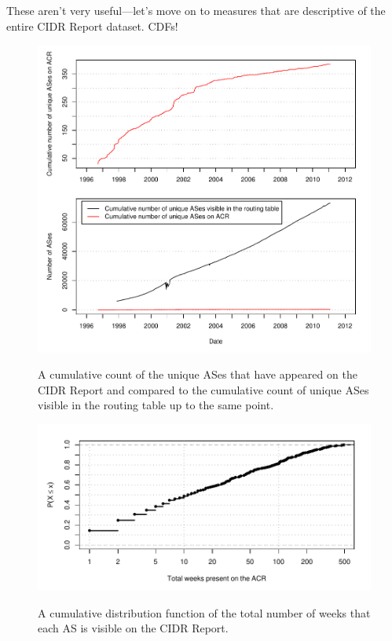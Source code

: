 These aren't very useful---let's move on to measures that are descriptive of the entire CIDR Report dataset. CDFs!

\begin{figure}[H]
\begin{centering}
    \includegraphics[width=6in]{figures/cumulative_asn_counts.pdf}
    \vspace{-2em}\\
    \caption{A cumulative count of the unique ASes that have appeared on the CIDR Report and compared to the cumulative count of unique ASes visible in the routing table up to the same point.}
\end{centering}
\end{figure}

\begin{figure}[H]
\begin{centering}
    \includegraphics[width=6in]{figures/acr_cdf_weeks.pdf}
    \vspace{-2em}\\
    \caption{A cumulative distribution function of the total number of weeks that each AS is visible on the CIDR Report.}
\end{centering}
\end{figure}

